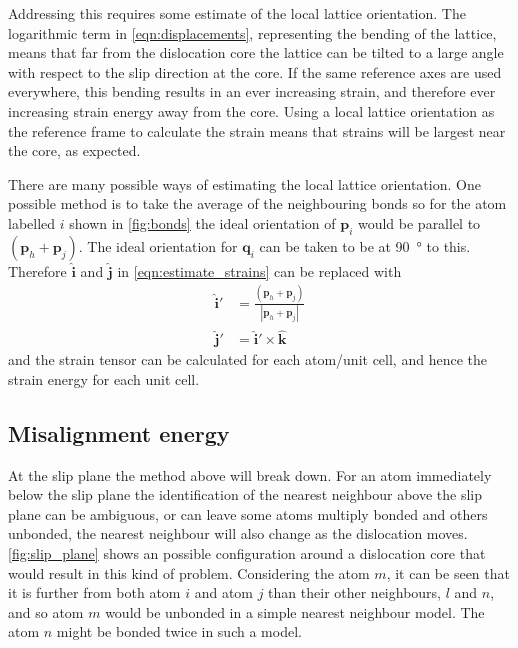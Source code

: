 Addressing this requires some estimate of the local lattice orientation. The logarithmic term in \autoref{eqn:displacements}, representing the bending of the lattice, means that far from the dislocation core the lattice can be tilted to a large angle with respect to the slip direction at the core. If the same reference axes are used everywhere, this bending results in an ever increasing strain, and therefore ever increasing strain energy away from the core. Using a local lattice orientation as the reference frame to calculate the strain means that strains will be largest near the core, as expected.


There are many possible ways of estimating the local lattice orientation. One possible method is to take the average of the neighbouring bonds so for the atom labelled $i$ shown in \autoref{fig:bonds} the ideal orientation of $\mathbf{p}_i$ would be  parallel to $(\mathbf{p}_h + \mathbf{p}_j)$. The ideal orientation for $\mathbf{q}_i$ can be taken to be at \SI{90}{\degree} to this. Therefore $\mathbf{\hat{i}}$ and $\mathbf{\hat{j}}$ in \autoref{eqn:estimate_strains} can be replaced with 
\begin{align}
\mathbf{\hat{i}}' &= \frac{(\mathbf{p}_h + \mathbf{p}_j)}{|\mathbf{p}_h + \mathbf{p}_j|} \nonumber \\
\mathbf{\hat{j}}' &= {\mathbf{\hat{i}}' \times \mathbf{\hat{k}}}
\end{align}
and the strain tensor can be calculated for each atom/unit cell, and hence the strain energy for each unit cell.




\subsection{Misalignment energy}


At the slip plane the method above will break down. For an atom immediately below the slip plane the identification of the nearest neighbour above the slip plane can be ambiguous, or can leave some atoms multiply bonded and others unbonded, the nearest neighbour will also change as the dislocation moves. \autoref{fig:slip_plane} shows an possible configuration around a dislocation core that would result in this kind of problem. Considering the atom $m$, it can be seen that it is further from both atom $i$ and atom $j$ than their other neighbours, $l$ and $n$, and so atom $m$ would be unbonded in a simple nearest neighbour model. The atom $n$ might be bonded twice in such a model.

